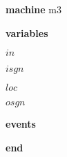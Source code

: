 \begin{block}
  \item   \textbf{machine} m3
  \item   \textbf{variables}
  \begin{block}
    \item   $in$
    \item   $isgn$
    \item   $loc$
    \item   $osgn$
  \end{block}
  \item   
  \item   
  \item   
  \item   
  \item   \textbf{events}
  \begin{block}
    \item   
    \item   
    \item   
    \item   
    \item   
  \end{block}
  \item   \textbf{end} \\
\end{block}
